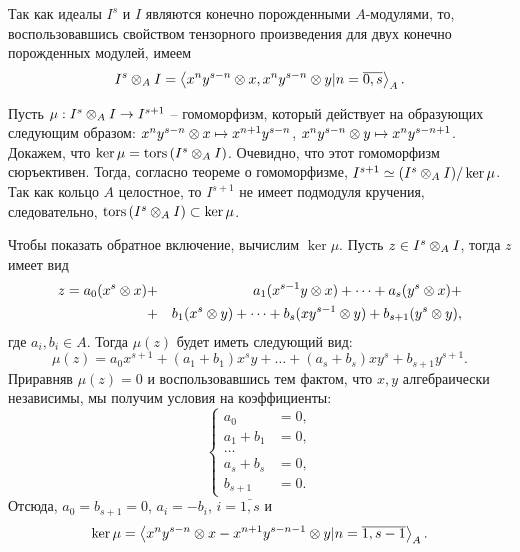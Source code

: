     \begin{Proof}
        Так как идеалы $I^s$ и $I$ являются ко\-неч\-но по\-ро\-жден\-ны\-ми $A$-мо\-ду\-ля\-ми, то, воспользовавшись свойством 
        тензорного произведения для двух конечно порожденных модулей, имеем
        \begin{equation*}
            I^s \otimes_A I = \left< x^ny^{s - n} \otimes x, x^ny^{s - n} \otimes y | n = \overline{0, s} \right>_A.
        \end{equation*}
        
        Пусть $\mu : I^s \otimes_A I \rightarrow I^{s + 1}$ -- гомоморфизм, который действует на образующих
        следующим образом: $x^ny^{s - n} \otimes x \mapsto x^{n + 1}y^{s - n}$, 
        $x^ny^{s - n} \otimes y \mapsto x^ny^{s - n + 1}$.
        Докажем, что $\ker \mu = \textup{tors}\left(I^s \otimes_A I\right)$. Очевидно, что этот гомоморфизм сюръективен. Тогда,
        согласно теореме о гомоморфизме, $I^{s + 1} \simeq (I^s \otimes_A I) / \ker \mu$. Так как кольцо
        $A$ целостное, то $I^{s + 1}$ не имеет подмодуля кручения, следовательно, 
        $\textup{tors}\left(I^s \otimes_A I\right) \subset \ker \mu$.

        Чтобы показать обратное включение, вычислим $\ker \mu$. Пусть $z \in I^s \otimes_A I$, тогда $z$
        имеет вид
        \begin{eqnarray*}
            z = a_0(x^s \otimes x) &+& a_1(x^{s - 1}y \otimes x) + \dots + a_s(y^s \otimes x) + \\
                               &+& b_1(x^{s} \otimes y) + \dots + b_s(xy^{s - 1} \otimes y) + 
                               b_{s + 1}(y^s \otimes y),
        \end{eqnarray*}
        где $a_i, b_i \in A$. Тогда $\mu(z)$ будет иметь следующий вид:
        \begin{equation*}
            \mu(z) = a_0x^{s + 1} + (a_1 + b_1)x^sy + \dots + (a_s + b_s)xy^{s} + b_{s + 1}y^{s + 1}.
        \end{equation*}
        Приравняв $\mu(z) = 0$ и воспользовавшись тем фактом, что $x, y$ алгебраически независимы,
        мы получим условия на коэффициенты:
        \begin{equation*}
            \begin{cases}
                a_0 &= 0,\\
                a_1 + b_1 &= 0,\\
                \dots \\
                a_s + b_s &= 0,\\
                b_{s + 1} &= 0.
            \end{cases}
        \end{equation*}
        Отсюда, $a_0 = b_{s + 1} = 0$, $a_i = -b_i$, $i = \bar{1, s}$ и 
        \begin{equation*}
            \ker \mu = \left< x^ny^{s - n} \otimes x - x^{n + 1}y^{s - n - 1} \otimes y |
            n = \overline{1, s-1}\right>_A.
        \end{equation*}
         

\end{Proof}
